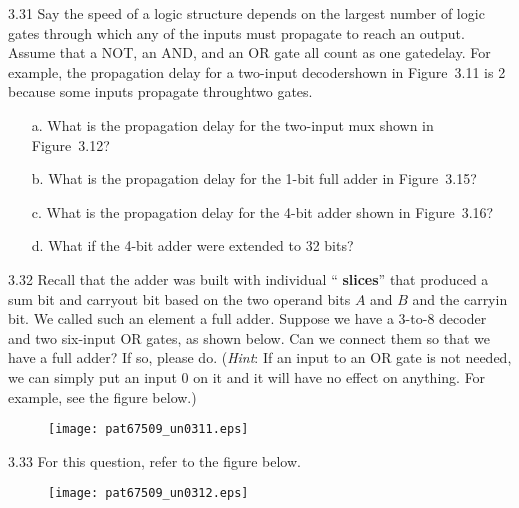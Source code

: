 \documentclass{patt}
\begin{document}
\begin{exercises}
\vspace*{\baselineskip}

\item[3.31] Say the speed of a logic structure depends on the largest
  number of logic gates through which any of the inputs must propagate
  to reach an output. Assume that a NOT, an AND, and an OR gate all
  count as one gate\hfill\break delay. For example, the propagation delay for a
  two-input decoder\hfill\break shown in Figure~3.11 is 2 because some inputs
  propagate through\hfill\break two gates.

\begin{enumerate}[a.]
\item[a.] What is the propagation delay for the two-input mux shown in
  Figure~3.12?
\item[b.] What is the propagation delay for the 1-bit full adder in\hfill\break
  Figure~3.15?

\item[c.] What is the propagation delay for the 4-bit adder shown
  in Figure~3.16?
\item[d.] What if the 4-bit adder were extended to 32 bits?
\end{enumerate}

\newpage

\item[3.32] Recall that the adder was built with individual ``{\bf
    slices}'' that produced a sum bit and carryout bit based on
  the two operand bits $A$ and $B$ and the carryin bit. We called
  such an element a full adder. Suppose we have a 3-to-8 decoder
  and two six-input OR gates, as shown below. Can we connect them
  so that we have  a full adder? If so, please do. ({\em Hint}: If
  an input to an OR gate is not needed, we can simply put an input
  0 on it and it will have no effect on anything. For example, see
  the figure below.)

  \begin{figure}[h]
  \centerline{\texttt{[image: pat67509\_un0311.eps]}}
  \end{figure}

\item[3.33] For this question, refer to the figure below.\vspace{12pt}

  \begin{figure}[h]
  \centerline{\texttt{[image: pat67509\_un0312.eps]}}
  \vspace{12pt}
  \end{figure}


\end{exercises}
\end{document}
